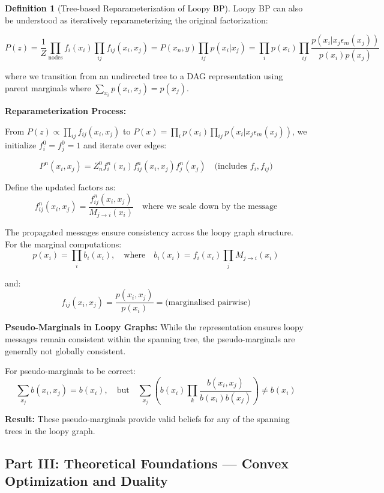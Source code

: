 \documentclass[12pt,a4paper]{article}
\theoremstyle{definition}
\newtheorem{definition}{Definition}[section]
\begin{document}
\begin{definition}[Tree-based Reparameterization of Loopy BP]
Loopy BP can also be understood as iteratively reparameterizing the original factorization:

\[
P(z) = \frac{1}{Z} \prod_{\text{nodes}} f_i(x_i) \prod_{ij} f_{ij}(x_i, x_j) = P(x_n, y) \prod_{ij} p(x_i | x_j) = \prod_i p(x_i) \prod_{ij} \frac{p(x_i | x_j \epsilon_m(x_j))}{p(x_i) p(x_j)}
\]

where we transition from an undirected tree to a DAG representation using parent marginals where $\sum_{x_i} p(x_i, x_j) = p(x_j)$.

\textbf{Reparameterization Process:}

From $P(z) \propto \prod_{ij} f_{ij}(x_i, x_j)$ to $P(x) = \prod_i p(x_i) \prod_{ij} p(x_i | x_j \epsilon_m(x_j))$, we initialize $f_i^0 = f_j^0 = 1$ and iterate over edges:

\[
P^n(x_i, x_j) = Z_n^0 f_i^n(x_i) f_{ij}^n(x_i, x_j) f_j^n(x_j) \quad \text{(includes } f_i, f_{ij})
\]

Define the updated factors as:
\[
f_{ij}^n(x_i, x_j) = \frac{f_{ij}^n(x_i, x_j)}{M_{j \to i}(x_i)} \quad \text{where we scale down by the message}
\]

The propagated messages ensure consistency across the loopy graph structure. For the marginal computations:
\[
p(x_i) = \prod_i b_i(x_i), \quad \text{where} \quad b_i(x_i) = f_i(x_i) \prod_j M_{j \to i}(x_i)
\]

and:
\[
f_{ij}(x_i, x_j) = \frac{p(x_i, x_j)}{p(x_i)} = \text{(marginalised pairwise)}
\]

\textbf{Pseudo-Marginals in Loopy Graphs:} While the representation ensures loopy messages remain consistent within the spanning tree, the pseudo-marginals are generally not globally consistent.

For pseudo-marginals to be correct:
\[
\sum_{x_j} b(x_i, x_j) = b(x_i), \quad \text{but} \quad \sum_{x_j} \left( b(x_i) \prod_k \frac{b(x_i, x_j)}{b(x_i) b(x_j)} \right) \neq b(x_i)
\]

\textbf{Result:} These pseudo-marginals provide valid beliefs for any of the spanning trees in the loopy graph.
\end{definition}

\newpage
\vspace*{2cm}
\begin{center}
    \section*{\Large Part III: Theoretical Foundations --- Convex Optimization and Duality}
\end{center}
\vspace*{1cm}
\nobreak
\end{document}
